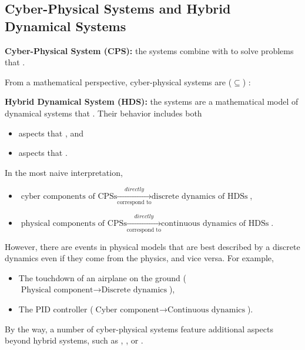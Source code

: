 \subsection{Cyber-Physical Systems and Hybrid Dynamical Systems}

\textbf{Cyber-Physical System (CPS):} the systems combine  
with  to solve problems that 
.

From a mathematical perspective, cyber-physical systems are ($\subseteq$) 
:

\textbf{Hybrid Dynamical System (HDS):} the systems are a mathematical model of dynamical 
systems that .
Their behavior includes both  
\vspace{-.5cm}
\begin{itemize}
  \item aspects that , and
  \item aspects that .
\end{itemize}

In the most naive interpretation, 
\vspace{-.5cm}
\begin{itemize}
  \item $\text{cyber components of CPSs} \xrightarrow[\text{correspond to}]{directly} 
    \text{discrete dynamics of HDSs}$,
  \item $\text{physical components of CPSs} \xrightarrow[\text{correspond to}]{directly} 
    \text{continuous dynamics of HDSs}$.
\end{itemize}

However, there are events in physical models that are best described by 
a discrete dynamics even if they come from the physics, and vice versa.
For example, 
\vspace{-.5cm}
\begin{itemize}
  \item The touchdown of an airplane on the ground 
    ($\text{Physical component} \to \text{Discrete dynamics}$),
  \item The PID controller 
    ($\text{Cyber component} \to \text{Continuous dynamics}$).
\end{itemize}

By the way, a number of cyber-physical systems feature additional 
  aspects beyond hybrid systems,
such as , ,
  or .

